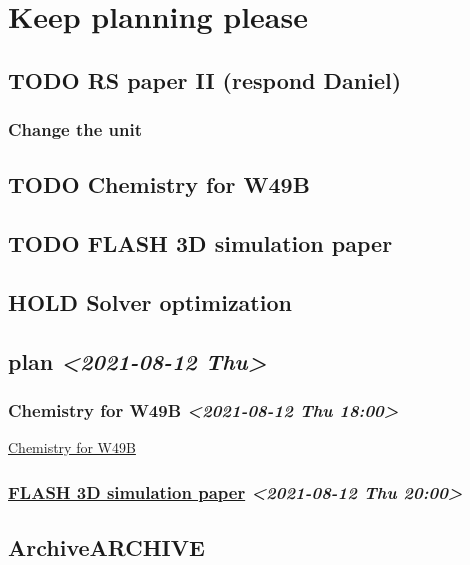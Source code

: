 \documentclass[11pt]{article}
\author{Gao-Yuan}
\date{\today}
\title{}
\begin{document}
\tableofcontents

\section{Keep planning please}
\label{sec:org0109382}
\subsection{{\bfseries\sffamily TODO} RS paper II (respond Daniel)}
\label{sec:org94a3ce2}
\subsubsection{Change the unit}
\label{sec:org17df63c}
\subsection{{\bfseries\sffamily TODO} Chemistry for W49B}
\label{sec:org2fd623a}
\subsection{{\bfseries\sffamily TODO} FLASH 3D simulation paper}
\label{sec:orgdac6019}
\subsection{{\bfseries\sffamily HOLD} Solver optimization}
\label{sec:org29aed07}
\subsection{plan \textit{<2021-08-12 Thu>}}
\label{sec:org5d627f0}
\subsubsection{Chemistry for W49B \textit{<2021-08-12 Thu 18:00>}}
\label{sec:org80877f0}
\hyperref[sec:org2fd623a]{Chemistry for W49B}
\subsubsection{\hyperref[sec:orgdac6019]{FLASH 3D simulation paper} \textit{<2021-08-12 Thu 20:00>}}
\label{sec:orgc70b9a6}
\subsection{Archive\hfill{}\textsc{ARCHIVE}}
\label{sec:org8a149a9}
\end{document}
